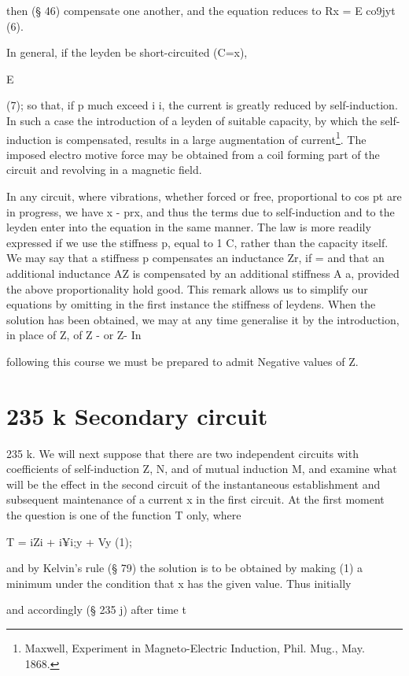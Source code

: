 then (§ 46) compensate one another, and the equation reduces to Rx = E co9jyt
(6).

In general, if the leyden be short-circuited (C=x),

E

(7); so that, if p much exceed i i, the current is greatly reduced by
self-induction. In such a case the introduction of a leyden of suitable
capacity, by which the self-induction is compensated, results in a large
augmentation of current\footnote{Maxwell, Experiment in Magneto-Electric
Induction, Phil. Mug., May.  1868.}. The imposed electro
motive force may be obtained from a coil forming part of the circuit
and revolving in a magnetic field.




In any circuit, where vibrations, whether forced or free, proportional to
cos pt are in progress, we have x - prx, and thus the terms due to
self-induction and to the leyden enter into the equation in the same manner.
The law is more readily expressed if we use the stiffness p, equal to 1 C,
rather than the capacity itself. We may say that a stiffness p compensates an
inductance Zr, if  = and that an additional inductance AZ is compensated by an
additional stiffness A a, provided the above proportionality hold good. This
remark allows us to simplify our equations by omitting in the first instance
the stiffness of leydens. When the solution has been obtained, we may at any
time generalise it by the introduction, in place of Z, of Z - or Z- In

following this course we must be prepared to admit Negative values of Z.

\section{235 k Secondary circuit}
235 k. We will next suppose that there are two independent circuits with coefficients
of self-induction Z, N, and of mutual induction M, and examine what will be the
effect in the second circuit of the instantaneous establishment and
subsequent maintenance of a current x in the first circuit. At the first moment
the question is one of the function T only, where

T = iZi + i¥i;y + Vy (1);

and by Kelvin's rule (§ 79) the solution is to be obtained by making (1) a
minimum under the condition that x has the given value. Thus initially

and accordingly (§ 235 j) after time t

